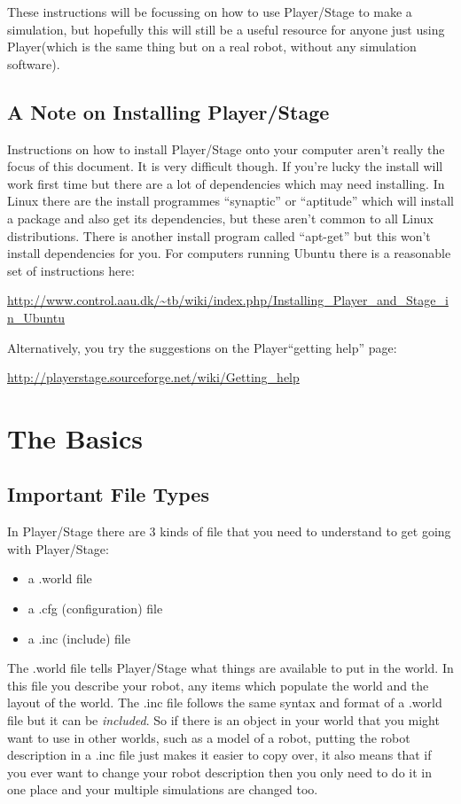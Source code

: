 \documentclass[a4paper]{report}
\newcommand{\plst}{Player/Stage\xspace}
\newcommand{\pl}{Player\xspace}
\begin{document}
These instructions will be focussing on how to use \plst to make a simulation, but hopefully this will still be a useful resource for anyone just using \pl (which is the same thing but on a real robot, without any simulation software).

\subsection{A Note on Installing \plst}
Instructions on how to install \plst onto your computer aren't really the focus of this document. It is very difficult though. If you're lucky the install will work first time but there are a lot of dependencies which may need installing. In Linux there are the install programmes ``synaptic'' or ``aptitude'' which will install a package and also get its dependencies, but these aren't common to all Linux distributions. There is another install program called ``apt-get'' but this won't install dependencies for you. For computers running Ubuntu there is a reasonable set of instructions here:
\begin{center}
\url{http://www.control.aau.dk/~tb/wiki/index.php/Installing_Player_and_Stage_in_Ubuntu}
\end{center}
Alternatively, you try the suggestions on the \pl ``getting help'' page:
\begin{center}
	\url{http://playerstage.sourceforge.net/wiki/Getting_help}
\end{center}

\section{The Basics}

\subsection{Important File Types}
In \plst there are 3 kinds of file that you need to understand to get going with \plst:
\begin{itemize}
	\item a .world file
	\item a .cfg (configuration) file
	\item a .inc (include) file
\end{itemize}
The .world file tells \plst what things are available to put in the world. In this file you describe your robot, any items which populate the world and the layout of the world. The .inc file follows the same syntax and format of a .world file but it can be \emph{included}. So if there is an object in your world that you might want to use in other worlds, such as a model of a robot, putting the robot description in a .inc file just makes it easier to copy over, it also means that if you ever want to change your robot description then you only need to do it in one place and your multiple simulations are changed too.
\end{document}
